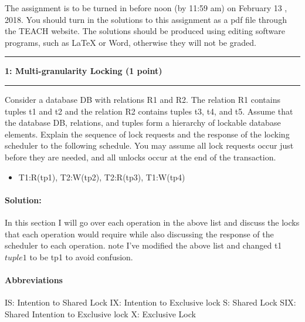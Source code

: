 \documentclass[11pt]{article}
\newcommand\question[2]{\vspace{.25in}\hrule\textbf{#1: #2}\vspace{.5em}\hrule\vspace{.10in}}
\begin{document}
\raggedright
\newcommand\NAME{Thomas Noelcke}  %
\newcommand\ANDREWID{noelcket}     %
\newcommand\HWNUM{5}              %


The assignment is to be turned in before noon (by 11:59 am) on February 13 , 2018. 
You should turn in the solutions to this assignment as a pdf file through the TEACH website.
The solutions should be produced using editing software programs, such as LaTeX or Word, otherwise they will not be graded.\\


\question{1}{Multi-granularity Locking (1 point)}
Consider a database DB with relations R1 and R2. 
The relation R1 contains tuples t1 and t2 and the relation R2 contains
tuples t3, t4, and t5. Assume that the database DB, relations, and tuples form a hierarchy of lockable database elements.
Explain the sequence of lock requests and the response of the locking scheduler to the following schedule. 
You may assume all lock requests occur just before they are needed, and all unlocks occur at the end of the transaction.
\vspace{0.5em}

\begin{itemize}
\item T1:R(tp1), T2:W(tp2), T2:R(tp3), T1:W(tp4)
\end{itemize}

\paragraph{Solution:} \hfill \break
In this section I will go over each operation in the above list and discuss the locks that each operation would require while also discussing the response of the scheduler to each operation. note I've modified the above list and changed t1 \(tuple 1\) to be tp1 to avoid confusion.\\

\paragraph{Abbreviations} \hfill \break
IS: Intention to Shared Lock \hfill \break
IX: Intention to Exclusive lock \hfill \break
S: Shared Lock\hfill \break
SIX: Shared Intention to Exclusive lock \hfill \break
X: Exclusive Lock \hfill \break
\end{document}
